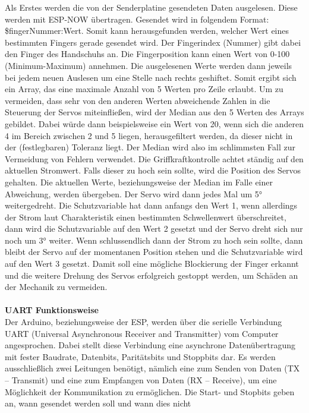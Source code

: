 \documentclass[titlepage,12pt,twoside]{article}
\begin{document}
\hfill \break
Als Erstes werden die von der Senderplatine gesendeten Daten ausgelesen. Diese 
werden mit ESP-NOW übertragen. Gesendet wird in folgendem Format: 
\$fingerNummer:Wert. Somit kann herausgefunden werden, welcher Wert eines 
bestimmten Fingers gerade gesendet wird. Der Fingerindex (Nummer) gibt dabei den 
Finger des Handschuhs an. Die Fingerposition kann einen Wert von 0-100 
(Minimum-Maximum) annehmen. Die ausgelesenen Werte werden dann jeweils bei jedem 
neuen Auslesen um eine Stelle nach rechts geshiftet. Somit ergibt sich ein Array, 
das eine maximale Anzahl von 5 Werten pro Zeile erlaubt. Um zu vermeiden, dass 
sehr von den anderen Werten abweichende Zahlen in die Steuerung der Servos miteinfließen, 
wird der Median aus den 5 Werten des Arrays gebildet. Dabei würde dann beispielsweise 
ein Wert von 20, wenn sich die anderen 4 im Bereich zwischen 2 und 5 liegen, 
herausgefiltert werden, da dieser nicht in der (festlegbaren) Toleranz liegt. 
Der Median wird also im schlimmsten Fall zur Vermeidung von Fehlern verwendet. 
Die Griffkraftkontrolle achtet ständig auf den aktuellen Stromwert. Falls dieser 
zu hoch sein sollte, wird die Position des Servos gehalten. Die aktuellen Werte, 
beziehungsweise der Median im Falle einer Abweichung, werden übergeben. Der 
Servo wird dann jedes Mal um 5° weitergedreht. Die Schutzvariable hat dann anfangs 
den Wert 1, wenn allerdings der Strom laut Charakteristik einen bestimmten Schwellenwert 
überschreitet, dann wird die Schutzvariable auf den Wert 2 gesetzt und der Servo 
dreht sich nur noch um 3° weiter. Wenn schlussendlich dann der Strom zu hoch sein 
sollte, dann bleibt der Servo auf der momentanen Position stehen und die Schutzvariable 
wird auf den Wert 3 gesetzt. Damit soll eine mögliche Blockierung der Finger 
erkannt und die weitere Drehung des Servos erfolgreich gestoppt werden, um 
Schäden an der Mechanik zu vermeiden. \\
\\
\textbf{UART Funktionsweise}
\\
Der Arduino, beziehungsweise der ESP, werden über die serielle Verbindung UART 
(Universal Asynchronous Receiver and Transmitter) vom Computer angesprochen. 
Dabei stellt diese Verbindung eine asynchrone Datenübertragung mit fester Baudrate, 
Datenbits, Paritätsbits und Stoppbits dar. Es werden ausschließlich zwei Leitungen 
benötigt, nämlich eine zum Senden von Daten (TX – Transmit) und eine zum Empfangen 
von Daten (RX – Receive), um eine Möglichkeit der Kommunikation zu ermöglichen. 
Die Start- und Stopbits geben an, wann gesendet werden soll und wann dies nicht 
\end{document}
